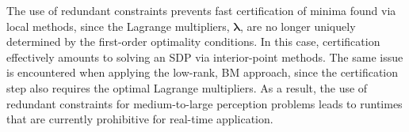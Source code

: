 \documentclass[lettersize,journal]{IEEEtran}
\newcommand{\rev}[1]{\color{red}{#1}\color{black}}
\begin{document}

The use of redundant constraints prevents fast certification of minima found via local methods, since the \rev{optimal } Lagrange multipliers, $ \bm{\lambda} $, are no longer uniquely determined by the first-order optimality conditions. In this case, certification effectively amounts to solving an SDP via interior-point methods. 
The same issue is encountered when applying the low-rank, BM approach, since the certification step also requires the optimal Lagrange multipliers.
As a result, the use of redundant constraints for medium-to-large perception problems leads to runtimes that are currently prohibitive for real-time application.

\rev{Indeed, a goal of this paper is to establish whether SDP relaxations of problems with matrix weights necessitate redundant constraints and, if so, whether it is possible to find global solutions efficiently enough for robotics applications.}
\end{document}
